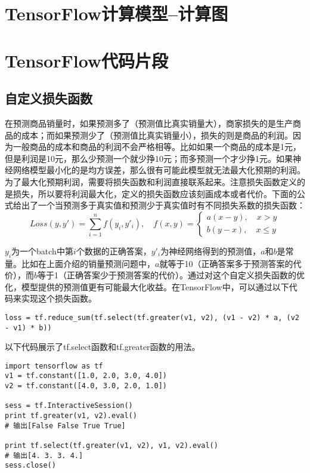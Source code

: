 \section{TensorFlow计算模型--计算图}

\section{TensorFlow代码片段}
\subsection{自定义损失函数}
在预测商品销量时，如果预测多了（预测值比真实销量大），商家损失的是生产商品的成本；而如果预测少了（预测值比真实销量小），损失的则是商品的利润。因为一般商品的成本和商品的利润不会严格相等。比如如果一个商品的成本是1元，但是利润是10元，那么少预测一个就少挣10元；而多预测一个才少挣1元。如果神经网络模型最小化的是均方误差，那么很有可能此模型就无法最大化预期的利润。为了最大化预期利润，需要将损失函数和利润直接联系起来。注意损失函数定义的是损失，所以要将利润最大化，定义的损失函数应该刻画成本或者代价。下面的公式给出了一个当预测多于真实值和预测少于真实值时有不同损失系数的损失函数：
\[
Loss(y,y')=\sum\limits_{i=1}^{n}{f(y_{i},y'_{i})}, \quad f(x,y)=\left\{
\begin{aligned}
    a(x-y), \quad x > y \\
    b(y-x), \quad x \leq y
\end{aligned}
\right.
\]

$y_{i}$为一个batch中第$i$个数据的正确答案，$y'_{i}$为神经网络得到的预测值，$a$和$b$是常量。比如在上面介绍的销量预测问题中，$a$就等于10（正确答案多于预测答案的代价），而$b$等于1（正确答案少于预测答案的代价）。通过对这个自定义损失函数的优化，模型提供的预测值更有可能最大化收益。在TensorFlow中，可以通过以下代码来实现这个损失函数。
\begin{verbatim}
loss = tf.reduce_sum(tf.select(tf.greater(v1, v2), (v1 - v2) * a, (v2 - v1) * b))
\end{verbatim}

以下代码展示了tf.select函数和tf.greater函数的用法。
\begin{verbatim}
import tensorflow as tf
v1 = tf.constant([1.0, 2.0, 3.0, 4.0])
v2 = tf.constant([4.0, 3.0, 2.0, 1.0])

sess = tf.InteractiveSession()
print tf.greater(v1, v2).eval()
# 输出[False False True True]

print tf.select(tf.greater(v1, v2), v1, v2).eval()
# 输出[4. 3. 3. 4.]
sess.close()
\end{verbatim}


